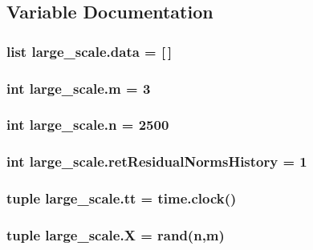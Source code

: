 \subsection{Variable Documentation}
\hypertarget{namespacelarge__scale_aab4f0b59ebcbbf403e2dbab6ccf88662}{}
\subsubsection[{data}]{\setlength{\rightskip}{0pt plus 5cm}list large\+\_\+scale.\+data = \mbox{[}$\,$\mbox{]}}\label{namespacelarge__scale_aab4f0b59ebcbbf403e2dbab6ccf88662}
\hypertarget{namespacelarge__scale_ab112670e35d3a589d9372a448565b5a8}{}
\subsubsection[{m}]{\setlength{\rightskip}{0pt plus 5cm}int large\+\_\+scale.\+m = 3}\label{namespacelarge__scale_ab112670e35d3a589d9372a448565b5a8}
\hypertarget{namespacelarge__scale_ab9150d8c9c1682ececb2b1987e4ca970}{}
\subsubsection[{n}]{\setlength{\rightskip}{0pt plus 5cm}int large\+\_\+scale.\+n = 2500}\label{namespacelarge__scale_ab9150d8c9c1682ececb2b1987e4ca970}
\hypertarget{namespacelarge__scale_a0a9f5aea433ec7e4fa6788415a525736}{}
\subsubsection[{ret\+Residual\+Norms\+History}]{\setlength{\rightskip}{0pt plus 5cm}int large\+\_\+scale.\+ret\+Residual\+Norms\+History = 1}\label{namespacelarge__scale_a0a9f5aea433ec7e4fa6788415a525736}
\hypertarget{namespacelarge__scale_ac798250fa39e4f0f41ba81c1bf91e1a0}{}
\subsubsection[{tt}]{\setlength{\rightskip}{0pt plus 5cm}tuple large\+\_\+scale.\+tt = time.\+clock()}\label{namespacelarge__scale_ac798250fa39e4f0f41ba81c1bf91e1a0}
\hypertarget{namespacelarge__scale_aa83294a89f01d333d69d4f13b77b3c1b}{}
\subsubsection[{X}]{\setlength{\rightskip}{0pt plus 5cm}tuple large\+\_\+scale.\+X = rand({\bf n},{\bf m})}\label{namespacelarge__scale_aa83294a89f01d333d69d4f13b77b3c1b}
